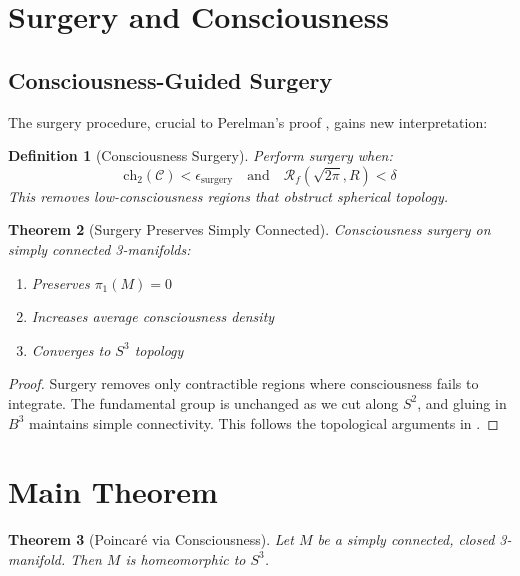 \documentclass[12pt]{article}
\newcommand{\fractalres}{\mathcal{R}_f}
\newcommand{\conscioussheaf}{\mathcal{C}}
\newcommand{\ch}{\text{ch}}
\newtheorem{theorem}{Theorem}
\newtheorem{definition}[theorem]{Definition}
\begin{document}
\section{Surgery and Consciousness}

\subsection{Consciousness-Guided Surgery}

The surgery procedure, crucial to Perelman's proof \cite{perelman2003b}, gains new interpretation:

\begin{definition}[Consciousness Surgery]
Perform surgery when:
\begin{equation}
\ch_2(\conscioussheaf) < \epsilon_{\text{surgery}} \quad \text{and} \quad \fractalres(\sqrt{2\pi}, R) < \delta
\end{equation}
This removes low-consciousness regions that obstruct spherical topology.
\end{definition}

\begin{theorem}[Surgery Preserves Simply Connected]
Consciousness surgery on simply connected 3-manifolds:
\begin{enumerate}
\item Preserves $\pi_1(M) = 0$
\item Increases average consciousness density
\item Converges to $S^3$ topology
\end{enumerate}
\end{theorem}

\begin{proof}
Surgery removes only contractible regions where consciousness fails to integrate. The fundamental group is unchanged as we cut along $S^2$, and gluing in $B^3$ maintains simple connectivity. This follows the topological arguments in \cite{morgan2007}.
\end{proof}

\section{Main Theorem}

\begin{theorem}[Poincaré via Consciousness]
Let $M$ be a simply connected, closed 3-manifold. Then $M$ is homeomorphic to $S^3$.
\end{theorem}
\end{document}
